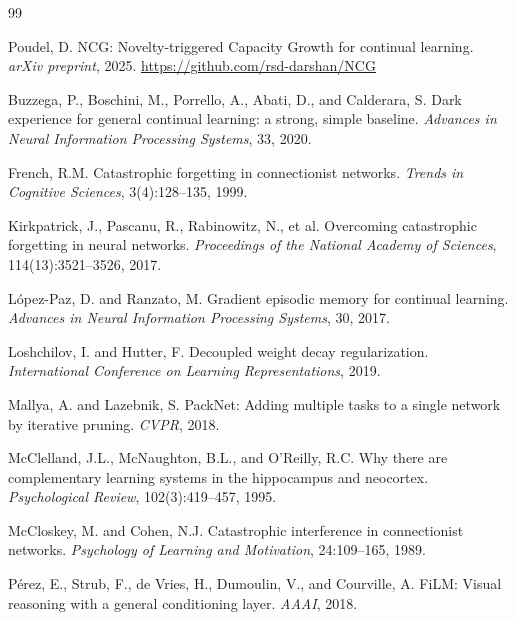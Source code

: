 \documentclass[10pt,twocolumn]{article}
\begin{document}

\begin{thebibliography}{99}

Poudel, D.
NCG: Novelty-triggered Capacity Growth for continual learning.
\emph{arXiv preprint}, 2025.
\url{https://github.com/rsd-darshan/NCG}

Buzzega, P., Boschini, M., Porrello, A., Abati, D., and Calderara, S.
Dark experience for general continual learning: a strong, simple baseline.
\emph{Advances in Neural Information Processing Systems}, 33, 2020.

French, R.M.
Catastrophic forgetting in connectionist networks.
\emph{Trends in Cognitive Sciences}, 3(4):128--135, 1999.

Kirkpatrick, J., Pascanu, R., Rabinowitz, N., et al.
Overcoming catastrophic forgetting in neural networks.
\emph{Proceedings of the National Academy of Sciences}, 114(13):3521--3526, 2017.

L\'{o}pez-Paz, D. and Ranzato, M.
Gradient episodic memory for continual learning.
\emph{Advances in Neural Information Processing Systems}, 30, 2017.

Loshchilov, I. and Hutter, F.
Decoupled weight decay regularization.
\emph{International Conference on Learning Representations}, 2019.

Mallya, A. and Lazebnik, S.
PackNet: Adding multiple tasks to a single network by iterative pruning.
\emph{CVPR}, 2018.

McClelland, J.L., McNaughton, B.L., and O'Reilly, R.C.
Why there are complementary learning systems in the hippocampus and neocortex.
\emph{Psychological Review}, 102(3):419--457, 1995.

McCloskey, M. and Cohen, N.J.
Catastrophic interference in connectionist networks.
\emph{Psychology of Learning and Motivation}, 24:109--165, 1989.

P\'{e}rez, E., Strub, F., de Vries, H., Dumoulin, V., and Courville, A.
FiLM: Visual reasoning with a general conditioning layer.
\emph{AAAI}, 2018.


\end{thebibliography}
\end{document}
